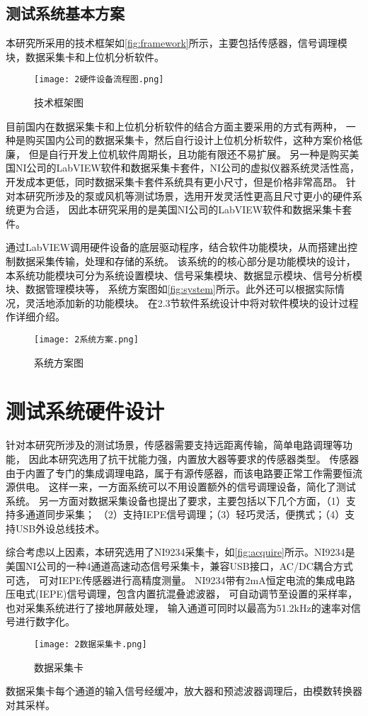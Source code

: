 \subsection{测试系统基本方案}
本研究所采用的技术框架如\autoref{fig:framework}所示，主要包括传感器，信号调理模块，数据采集卡和上位机分析软件。
\begin{figure}[htbp]
    \centering
    \texttt{[image: 2硬件设备流程图.png]}
    \caption{\label{fig:framework}技术框架图}
\end{figure}

目前国内在数据采集卡和上位机分析软件的结合方面主要采用的方式有两种，
一种是购买国内公司的数据采集卡，然后自行设计上位机分析软件，这种方案价格低廉，
但是自行开发上位机软件周期长，且功能有限还不易扩展。
另一种是购买美国NI公司的LabVIEW软件和数据采集卡套件，NI公司的虚拟仪器系统灵活性高，
开发成本更低，同时数据采集卡套件系统具有更小尺寸，但是价格非常高昂。
针对本研究所涉及的泵或风机等测试场景，选用开发灵活性更高且尺寸更小的硬件系统更为合适，
因此本研究采用的是美国NI公司的LabVIEW软件和数据采集卡套件。

通过LabVIEW调用硬件设备的底层驱动程序，结合软件功能模块，从而搭建出控制数据采集传输，处理和存储的系统。
该系统的的核心部分是功能模块的设计，本系统功能模块可分为系统设置模块、信号采集模块、数据显示模块、信号分析模块、数据管理模块等，
系统方案图如\autoref{fig:system}所示。此外还可以根据实际情况，灵活地添加新的功能模块。
在2.3节软件系统设计中将对软件模块的设计过程作详细介绍。
\begin{figure}[htbp]
    \centering
    \texttt{[image: 2系统方案.png]}
    \caption{\label{fig:system}系统方案图}
\end{figure}

\section{测试系统硬件设计}
针对本研究所涉及的测试场景，传感器需要支持远距离传输，简单电路调理等功能，
因此本研究选用了抗干扰能力强，内置放大器等要求的传感器类型。
传感器由于内置了专门的集成调理电路，属于有源传感器，而该电路要正常工作需要恒流源供电。
这样一来，一方面系统可以不用设置额外的信号调理设备，简化了测试系统。
另一方面对数据采集设备也提出了要求，主要包括以下几个方面，（1）支持多通道同步采集；
（2）支持IEPE信号调理；（3）轻巧灵活，便携式；（4）支持USB外设总线技术。

综合考虑以上因素，本研究选用了​NI9234采集卡，如\autoref{fig:acquire}所示。
​NI9234是美国NI公司的一种4通道高速动态信号采集卡，兼容USB接口，AC/DC耦合方式可选，
可对IEPE传感器进行高精度测量。
NI9234带有2mA恒定电流的集成电路压电式(IEPE)信号调理，包含内置抗混叠滤波器，
可自动调节至设置的采样率，也对采集系统进行了接地屏蔽处理，
输入通道可同时以最高为51.2$\mathrm{kHz}$的速率对信号进行数字化。
\begin{figure}[htbp]
    \centering
    \texttt{[image: 2数据采集卡.png]}
    \caption{\label{fig:acquire}数据采集卡}
\end{figure}
​
数据采集卡每个通道的输入信号经缓冲，放大器和预滤波器调理后，由模数转换器对其采样。

